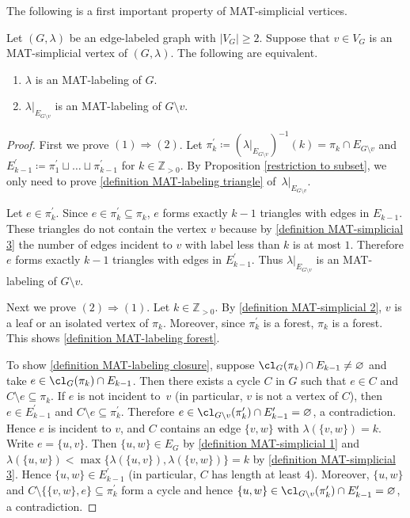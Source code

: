The following is a first important property of MAT-simplicial vertices.
\begin{proposition}\label{MAT-simplicial}
Let $ (G, \lambda) $ be an edge-labeled graph with $ |V_{G}| \geq 2 $. 
Suppose that $ v \in V_{G} $ is an MAT-simplicial vertex of $ (G,\lambda) $. 
The following are equivalent. 
\begin{enumerate}[(1)]
\item $ \lambda $ is an MAT-labeling of $ G $. 
\item $ \lambda|_{E_{G\setminus v}} $ is an MAT-labeling of $ G\setminus v $. 
\end{enumerate}
\end{proposition}
\begin{proof}
First we prove $ (1) \Rightarrow (2) $. 
Let $ \pi_{k}^{\prime} \coloneqq (\lambda|_{E_{G\setminus v}})^{-1}(k) =\pi_k \cap E_{G\setminus v}$ and $ E_{k-1}^{\prime} \coloneqq \pi^{\prime}_{1} \sqcup \dots \sqcup \pi^{\prime}_{k-1} $ for $ k \in \mathbb{Z}_{>0} $. 
By Proposition  \ref{restriction to subset}, we only need to prove \ref{definition MAT-labeling triangle} of~$ \lambda|_{E_{G\setminus v}} $.

Let $ e \in \pi_{k}^{\prime} $. 
Since $ e \in \pi_{k}^{\prime} \subseteq \pi_{k} $, $ e $ forms exactly $ k-1 $ triangles with edges in $ E_{k-1} $. 
These triangles do not contain the vertex $ v $ because by \ref{definition MAT-simplicial 3} the number of edges incident to $ v $ with label less than $ k $ is at most $ 1 $. 
Therefore $ e $ forms exactly $ k-1 $ triangles with edges in $ E_{k-1}^{\prime} $. 
Thus $ \lambda|_{E_{G\setminus v}} $ is an MAT-labeling of $ G\setminus v $. 

Next we prove $ (2) \Rightarrow (1) $. 
Let $ k \in \mathbb{Z}_{>0} $.
By  \ref{definition MAT-simplicial 2}, $ v $ is a leaf or  an isolated vertex of $ \pi_{k} $. 
Moreover, since $ \pi_{k}^{\prime} $ is a forest, $ \pi_{k} $ is a forest. 
This shows \ref{definition MAT-labeling forest}. 

To show \ref{definition MAT-labeling closure}, suppose $ \cl_{G}(\pi_{k}) \cap E_{k-1} \neq \varnothing $ and take $ e \in \cl_{G}(\pi_{k}) \cap E_{k-1} $. 
Then there exists a cycle $ C $ in $G$ such that $ e \in C $ and $ C \setminus e \subseteq \pi_{k} $. 
If $ e $ is not incident to~$ v $ (in particular, $v$ is not a vertex of $C$), then $ e \in E_{k-1}^{\prime} $ and $ C \setminus e \subseteq \pi_{k}^{\prime} $. 
Therefore $ e \in \cl_{G\setminus v}(\pi_{k}^{\prime}) \cap E_{k-1}^{\prime} = \varnothing$, a contradiction. 
Hence $ e $ is incident to $ v $, and $ C $ contains an edge $ \{v,w\} $ with $ \lambda(\{v,w\}) = k $. 
Write $ e = \{u,v\} $. 
Then $ \{u,w\} \in E_{G} $ by \ref{definition MAT-simplicial 1} and $ \lambda(\{u,w\}) < \max\{\lambda(\{u,v\}), \lambda(\{v,w\})\} = k $ by \ref{definition MAT-simplicial 3}. 
Hence $ \{u,w\} \in E_{k-1}^{\prime} $ (in particular, $C$ has length at least $4$).
Moreover,  $ \{u,w\}$ and $ C \setminus\{\{v,w\}, e\} \subseteq \pi_{k}^{\prime} $ form a cycle and hence $ \{u,w\} \in \cl_{G\setminus v}(\pi_{k}^{\prime}) \cap E_{k-1}^{\prime}= \varnothing$, a contradiction. 


\end{proof}
